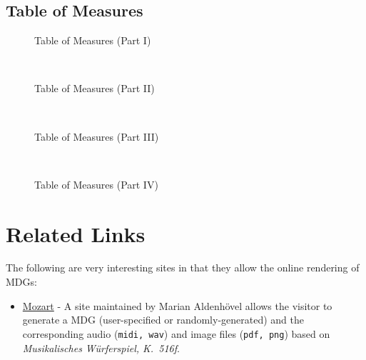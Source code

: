 \documentclass[letterpaper,x11names,svgnames,10pt]{article}
\begin{document}
{\nopagebreak[4]
\subsection{Table of Measures}

\begin{figure}[H]
	\centering
	\def\svgwidth{0.975\columnwidth}
	
	\caption{Table of Measures (Part I)}
	\label{fig:meas1}
\end{figure}

\newpage
${}_{}$\\
\vspace{0.10in}
\begin{figure}[H]
	\centering
	\def\svgwidth{0.975\columnwidth}
	
	\caption{Table of Measures (Part II)}
	\label{fig:meas2}
\end{figure}

\newpage
${}_{}$\\
\vspace{0.10in}
\begin{figure}[H]
	\centering
	\def\svgwidth{0.975\columnwidth}
	
	\caption{Table of Measures (Part III)}
	\label{fig:meas3}
\end{figure}

\newpage
${}_{}$\\
\vspace{0.10in}
\begin{figure}[H]
	\centering
	\def\svgwidth{0.975\columnwidth}
	
	\caption{Table of Measures (Part IV)}
	\label{fig:meas4}
\end{figure}


\newpage
\section{Related Links}
The following are very interesting sites in that they allow the online rendering of MDGs:
\begin{itemize}
	\item  \hyperlink{https://marian-aldenhoevel.de/mozart/}{Mozart} - A site maintained by Marian Aldenh\"{o}vel allows the visitor to generate a MDG (user-specified or randomly-generated) and the corresponding audio ({\tt midi, wav}) and image files ({\tt pdf, png}) based on {\em Musikalisches W\"{u}rferspiel, K.\ 516f}.
	

\end{itemize}}
\end{document}
